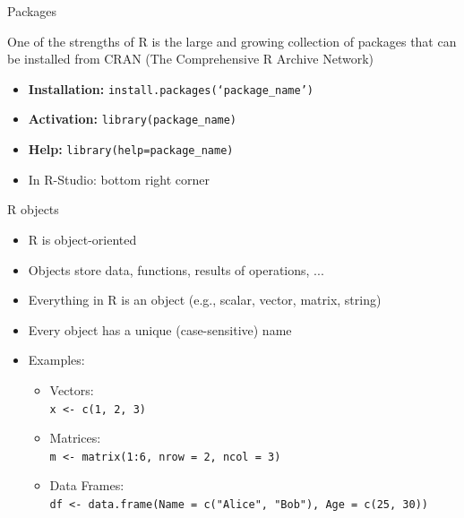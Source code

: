 \documentclass[aspectratio=169]{beamer}
\begin{document}
\begin{frame}{Packages}

One of the strengths of R is the large and growing collection of packages that can be installed from CRAN (The Comprehensive R Archive Network)\smallskip

\begin{itemize}
    \item \textbf{Installation:} \texttt{install.packages(`package\_name')}\smallskip
    \item \textbf{Activation:} \texttt{library(package\_name)}\smallskip
    \item \textbf{Help:} \texttt{library(help=package\_name)}\smallskip
    \item In R-Studio: bottom right corner\smallskip
\end{itemize}
\end{frame}

\begin{frame}{R objects}
\begin{itemize}
    \item R is object-oriented \smallskip
    \item Objects store data, functions, results of operations, ...\smallskip
    \item Everything in R is an object (e.g., scalar, vector, matrix, string)\smallskip
    \item Every object has a unique (case-sensitive) name\smallskip
    \item Examples:
    \begin{itemize}
        \item[$\bullet$] Vectors: \\
            \texttt{x <- c(1, 2, 3)}
        \item[$\bullet$] Matrices: \\
            \texttt{m <- matrix(1:6, nrow = 2, ncol = 3)}
        \item[$\bullet$] Data Frames: \\
            \texttt{df <- data.frame(Name = c("Alice", "Bob"), Age = c(25, 30))}
    \end{itemize}
\end{itemize}

\end{frame}
\end{document}
